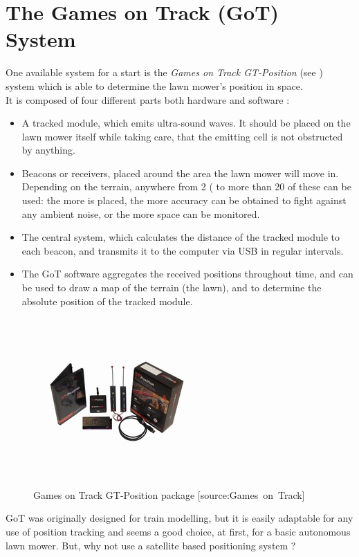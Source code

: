 \section{The Games on Track (GoT) System}
One available system for a start is the \emph{Games on Track GT-Position} (see ) system which is able to determine the lawn mower's position in space.\\
%
It is composed of four different parts both hardware and software \cite{GOTWebsitePos} :
\begin{itemize}
	\item A tracked module, which emits ultra-sound waves. It should be placed on the lawn mower itself while taking care, that the emitting cell is not obstructed by anything.
	\item Beacons or receivers, placed around the area the lawn mower will move in. Depending on the terrain, anywhere from 2 ( to more than 20 of these can be used: the more is placed, the more accuracy can be obtained to fight against any ambient noise, or the more space can be monitored.
	\item The central system, which calculates the distance of the tracked module to each beacon, and transmits it to the computer via USB in regular intervals.
	\item The GoT software aggregates the received positions throughout time, and can be used to draw a map of the terrain (the lawn), and to determine the absolute position of the tracked module.
\end{itemize}

\begin{figure}[H]
\centering
\includegraphics[scale=1.1]{figures/gotSystem.jpg} 
\caption{Games on Track GT-Position package [source:Games\ on\ Track]} 
\label{fig:gotsystem}
\end{figure}
\noindent

GoT was originally designed for train modelling, but it is easily adaptable for any use of position tracking and seems a good choice, at first, for a basic autonomous lawn mower.
But, why not use a satellite based positioning system ?
